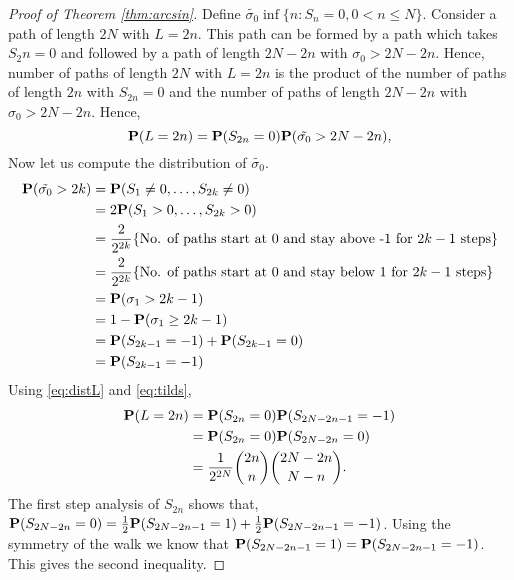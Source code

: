 \documentclass[main]{subfiles}
\begin{document}
\begin{proof}[Proof of Theorem \ref{thm:arcsin}]
    Define $\tilde{\sigma_0}\inf\{n: S_n=0, 0< n\le N\}$.
    Consider a path of length $2N$ with $L=2n$. This path can be formed by a path which takes $S_2n=0$ and followed by a path of length $2N-2n$ with $\sigma_0>2N-2n$. Hence, number of paths of length $2N$ with $L=2n$ is the product of the number of paths of length $2n$ with $S_{2n}=0$ and the number of paths of length $2N-2n$ with $\sigma_0>2N-2n$.
    Hence,
    \begin{equation}
        \P(L=2n)=\P(S_{2n}=0)\P(\tilde{\sigma_0}>2N-2n),
        \label{eq:distL}
    \end{equation}
    Now let us compute the distribution of $\tilde{\sigma_0}$.
    \begin{equation}
        \begin{aligned}
            \P(\tilde{\sigma_0}>2k) & =\P(S_1\ne 0, \ldots, S_{2k}\ne 0)                                                           \\
                                    & =2\P(S_1> 0, \ldots, S_{2k}> 0)                                                              \\
                                    & =\frac{2}{2^{2k}} \{\text{No. of paths start at 0 and stay above -1 for }2k-1\text{ steps}\} \\
                                    & =\frac{2}{2^{2k}} \{\text{No. of paths start at 0 and stay below 1 for }2k-1\text{ steps}\}  \\
                                    & =\P(\sigma_1>2k-1)                                                                           \\
                                    & =1-\P(\sigma_1\geq 2k-1)                                                                     \\
                                    & =\P(S_{2k-1}=-1)+\P(S_{2k-1}=0)                                                              \\
                                    & =\P(S_{2k-1}=-1)
        \end{aligned}
        \label{eq:tilds}
    \end{equation}
    Using \eqref{eq:distL} and \eqref{eq:tilds},
    $$
        \begin{aligned}
            \P(L=2n) & =\P(S_{2n}=0)\P(S_{2N-2n-1}=-1)                    \\
                     & =\P(S_{2n}=0)\P(S_{2N-2n}=0)                       \\
                     & = \frac{1}{2^{2N}}\binom{2n}{n}\binom{2N-2n}{N-n}.
        \end{aligned}
    $$
    The first step analysis of $S_{2n}$ shows that, $\P(S_{2N-2n}=0)=\frac{1}{2}\P(S_{2N-2n-1}=1)+\frac{1}{2}\P(S_{2N-2n-1}=-1)$. Using the symmetry of the walk we know that $\P(S_{2N-2n-1}=1)=\P(S_{2N-2n-1}=-1)$. This gives the second inequality.
\end{proof}
\end{document}
